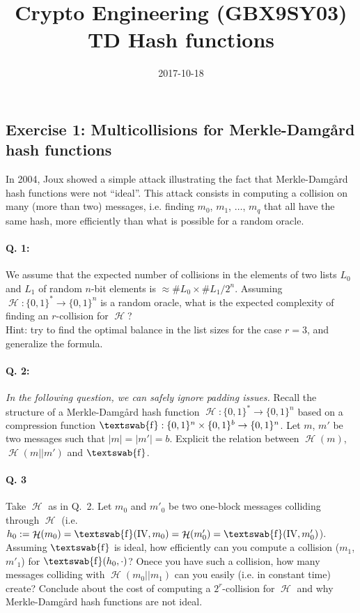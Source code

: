 \documentclass[11pt,a4paper]{article}
\title{Crypto Engineering (GBX9SY03)\\
TD Hash functions}
\date{2017-10-18}
\DeclareMathOperator\hash{\mathcal{H}}
\DeclareMathOperator\comp{\textswab{f}}
\begin{document}
\maketitle{}

\subsection*{Exercise 1: Multicollisions for Merkle-Damg\aa rd hash functions}
In 2004, Joux showed a simple attack illustrating the fact that Merkle-Damg\aa rd hash functions were not ``ideal''. This attack consists in computing a collision on many
(more than two) messages, i.e. finding $m_0$, $m_1$, $\ldots$, $m_q$ that all have the same hash, more efficiently than what is possible for a random oracle.

\paragraph{Q. 1:} We assume that the expected number of collisions in the elements of two lists $L_0$ and $L_1$ of random $n$-bit elements is $\approx \#L_0\times\#L_1/2^n$.
Assuming $\hash : \{0,1\}^* \rightarrow \{0,1\}^n$ is a random oracle, what is the expected complexity of finding an $r$-collision for $\hash$?\\
{\footnotesize Hint: try to find the optimal balance in the list sizes for the case $r = 3$, and generalize the formula.}

\paragraph{Q. 2:} \emph{In the following question, we can safely ignore padding issues.} Recall the structure of a Merkle-Damg\aa rd hash function
$\hash : \{0,1\}^* \rightarrow \{0,1\}^n$ based on a compression function $\comp : \{0,1\}^n \times \{0,1\}^b \rightarrow \{0,1\}^n$.
Let $m$, $m'$ be two messages such that $|m| = |m'| = b$.
Explicit the relation between $\hash(m)$, $\hash(m||m')$ and $\comp$.

\paragraph{Q. 3} Take $\hash$ as in Q.~2. Let $m_0$ and $m'_0$ be two one-block messages colliding through $\hash$ (i.e. $h_0 :=
\hash(m_0) = \comp(\text{IV}, m_0) = \hash(m'_0) = \comp(\text{IV}, m'_0)$). Assuming $\comp$ is ideal, how efficiently can you compute a collision
($m_1$, $m'_1$) for $\comp(h_0, \cdot)$? Onece you have such a collision, how many messages colliding with $\hash(m_0||m_1)$ can you easily (i.e. in
constant time) create? Conclude about the cost of
computing a $2^r$-collision for $\hash$ and why Merkle-Damg\aa rd hash functions are not ideal.
\end{document}
